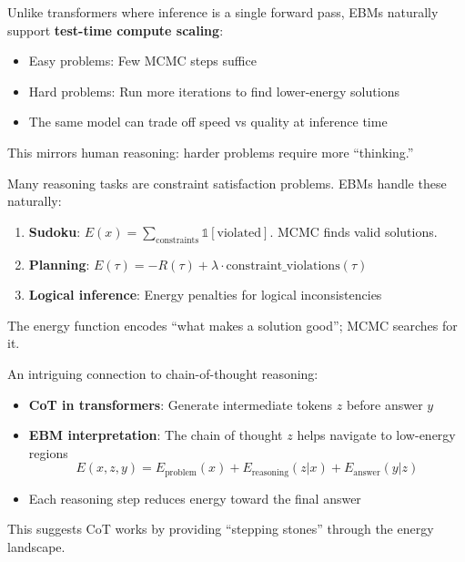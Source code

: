 \begin{remark}
    Unlike transformers where inference is a single forward pass, EBMs naturally support \textbf{test-time compute scaling}:
    \begin{itemize}
        \item Easy problems: Few MCMC steps suffice
        \item Hard problems: Run more iterations to find lower-energy solutions
        \item The same model can trade off speed vs quality at inference time
    \end{itemize}
    This mirrors human reasoning: harder problems require more ``thinking.''
\end{remark}

\begin{remark}
    Many reasoning tasks are constraint satisfaction problems. EBMs handle these naturally:
    \begin{enumerate}
        \item \textbf{Sudoku}: $E(x) = \sum_{\text{constraints}} \mathbb{1}[\text{violated}]$. MCMC finds valid solutions.
        \item \textbf{Planning}: $E(\tau) = -R(\tau) + \lambda \cdot \text{constraint\_violations}(\tau)$
        \item \textbf{Logical inference}: Energy penalties for logical inconsistencies
    \end{enumerate}
    The energy function encodes ``what makes a solution good''; MCMC searches for it.
\end{remark}

\begin{remark}
    An intriguing connection to chain-of-thought reasoning:
    \begin{itemize}
        \item \textbf{CoT in transformers}: Generate intermediate tokens $z$ before answer $y$
        \item \textbf{EBM interpretation}: The chain of thought $z$ helps navigate to low-energy regions
        \[
            E(x, z, y) = E_{\text{problem}}(x) + E_{\text{reasoning}}(z | x) + E_{\text{answer}}(y | z)
        \]
        \item Each reasoning step reduces energy toward the final answer
    \end{itemize}
    This suggests CoT works by providing ``stepping stones'' through the energy landscape.
\end{remark}

